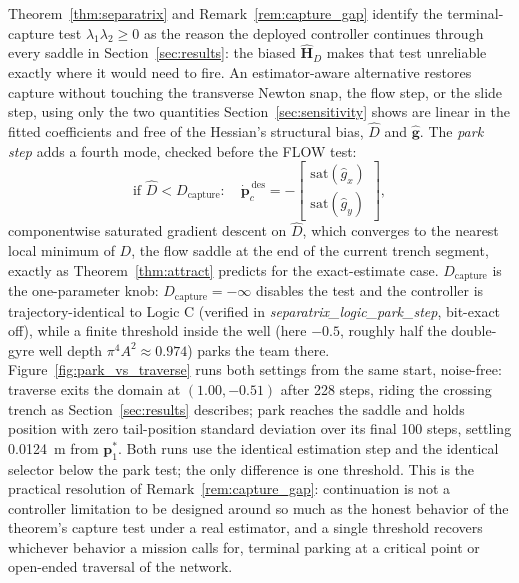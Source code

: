 \documentclass[12pt, letterpaper, oneside]{report}
\begin{document}
Theorem~\ref{thm:separatrix} and Remark~\ref{rem:capture_gap} identify
the terminal-capture test $\lambda_1\lambda_2 \geq 0$ as the reason the
deployed controller continues through every saddle in
Section~\ref{sec:results}: the biased $\hat{\mathbf{H}}_D$ makes that
test unreliable exactly where it would need to fire. An estimator-aware
alternative restores capture without touching the transverse Newton
snap, the flow step, or the slide step, using only the two quantities
Section~\ref{sec:sensitivity} shows are linear in the fitted
coefficients and free of the Hessian's structural bias, $\hat{D}$ and
$\hat{\mathbf{g}}$. The \emph{park step} adds a fourth mode, checked
before the FLOW test:
\begin{equation}
    \text{if } \hat{D} < D_{\text{capture}}:\quad
    \dot{\mathbf{p}}_c^{\,\text{des}} =
    -\begin{bmatrix}
        \mathrm{sat}(\hat{g}_x) \\ \mathrm{sat}(\hat{g}_y)
    \end{bmatrix},
    \label{eq:park_step}
\end{equation}
componentwise saturated gradient descent on $\hat{D}$, which converges
to the nearest local minimum of $D$, the flow saddle at the end of the
current trench segment, exactly as Theorem~\ref{thm:attract} predicts
for the exact-estimate case. $D_{\text{capture}}$ is the one-parameter
knob: $D_{\text{capture}} = -\infty$ disables the test and the
controller is trajectory-identical to Logic C (verified in
\textit{separatrix\_logic\_park\_step}, bit-exact off), while a finite
threshold inside the well (here $-0.5$, roughly half the double-gyre
well depth $\pi^4 A^2 \approx 0.974$) parks the team there.
Figure~\ref{fig:park_vs_traverse} runs both settings from the same start,
noise-free: traverse exits the domain at $(1.00, -0.51)$ after 228
steps, riding the crossing trench as Section~\ref{sec:results}
describes; park reaches the saddle and holds position with zero
tail-position standard deviation over its final 100 steps, settling
0.0124~m from $\mathbf{p}^*_1$. Both runs use the identical estimation
step and the identical selector below the park test; the only
difference is one threshold. This is the practical resolution of
Remark~\ref{rem:capture_gap}: continuation is not a controller limitation
to be designed around so much as the honest behavior of the theorem's
capture test under a real estimator, and a single threshold recovers
whichever behavior a mission calls for, terminal parking at a critical
point or open-ended traversal of the network.
\end{document}
